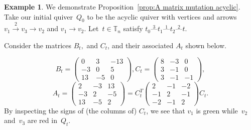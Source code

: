 \documentclass[11pt, letterpaper]{amsart}
\theoremstyle{definition}
\newtheorem{example}[theorem]{Example}
\numberwithin{equation}{section}
\begin{document}
\begin{example}
\label{eg:congruenceAB}
We demonstrate Proposition~\ref{prop:A matrix mutation acyclic}. 
Take our initial quiver~$Q_0$ to be the acyclic quiver with vertices and arrows $ v_1 \stackrel{2}{\rightarrow} v_3 \stackrel{}{\rightarrow} v_2$ and $v_1\stackrel{}{\rightarrow} v_2$. Let~$t \in \mathbb T_n$ satisfy 
$t_0 \stackrel{3}{\text{---}} t_1 \stackrel{1}{\text{---}} t_2 \stackrel{2}{\text{---}} t.$

Consider the matrices $B_t,$ and $C_t$, and their associated $A_t$ shown below.

$$B_t = \begin{pmatrix} 0 & 3 & -13 \\ -3 & 0 & 5 \\ 13 & -5 & 0 \end{pmatrix}, C_t = \begin{pmatrix} 8 & -3 & 0 \\ 3 & -1 & 0 \\ 3 & -1 & -1 \end{pmatrix},$$
$$A_t = \begin{pmatrix} 2 & -3 & 13 \\ -3 & 2 & -5 \\ 13 & -5 & 2 \end{pmatrix} = C_t^T \begin{pmatrix} 2 & -1 & -2 \\ -1 & 2 & -1 \\ -2 & -1 & 2 \end{pmatrix} C_t.$$
By inspecting the signs of (the columns of) $C_t$, we see that $v_1$ is green while~$v_2$ and~$v_3$ are red in~$Q_t$.


\end{example}
\end{document}
